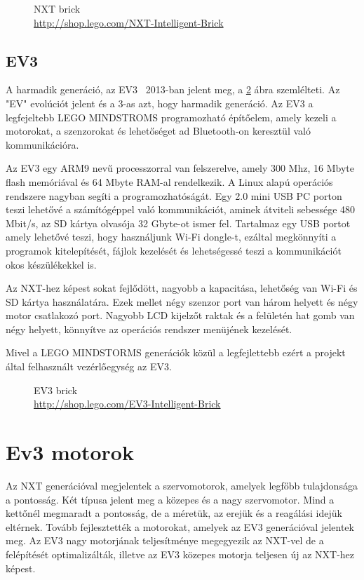 \begin{figure}[!htb]
	\centering
	\caption[NXT brick]
	{NXT brick\\
	\href{http://shop.lego.com/en-CA/NXT-Intelligent-Brick-9841}{http://shop.lego.com/NXT-Intelligent-Brick}}
	\label{fig:NXT}
\end{figure}

\subsection{EV3}

A harmadik generáció, az EV3~\cite{ev3Attribution}\cite{nxtVsEv3} 2013-ban jelent meg, a \ref{fig:EV3} ábra szemlélteti. Az "EV" evolúciót jelent és a 3-as azt, hogy harmadik generáció. Az EV3 a legfejeltebb LEGO MINDSTROMS programozható építőelem, amely kezeli a motorokat, a szenzorokat és lehetőséget ad Bluetooth-on keresztül való kommunikációra.

Az EV3 egy ARM9 nevű processzorral van felszerelve, amely 300 Mhz, 16 Mbyte flash memóriával és 64 Mbyte RAM-al rendelkezik. A Linux alapú operációs rendszere nagyban segíti a programozhatóságát. Egy 2.0 mini USB PC porton teszi lehetővé a számítógéppel való kommunikációt, aminek átviteli sebessége 480 Mbit/s, az SD kártya olvasója 32 Gbyte-ot ismer fel. Tartalmaz egy USB portot amely lehetővé teszi, hogy használjunk Wi-Fi dongle-t, ezáltal megkönnyíti a programok kitelepítését, fájlok kezelését és lehetségessé teszi a kommunikációt okos készülékekkel is.

Az NXT-hez képest sokat fejlődött, nagyobb a kapacitása, lehetőség van Wi-Fi és SD kártya használatára. Ezek mellet négy szenzor port van három helyett és négy motor csatlakozó port. Nagyobb LCD kijelzőt raktak és a felületén hat gomb van négy helyett, könnyítve az operációs rendszer menüjének kezelését.\cite{nxtVsEv3}

Mivel a LEGO MINDSTORMS generációk közül a legfejlettebb ezért a projekt által felhasznált vezérlőegység az EV3.

\begin{figure}[!htb]
	\centering
	\caption[EV3 brick]
	{EV3 brick\\
	\href{http://shop.lego.com/en-CA/EV3-Intelligent-Brick-45500}{http://shop.lego.com/EV3-Intelligent-Brick}}
	\label{fig:EV3}
\end{figure}


\section{Ev3 motorok}\label{sec:ROBOT:motorok}
Az NXT generációval megjelentek a szervomotorok, amelyek legfőbb tulajdonsága a pontosság. Két típusa jelent meg a közepes és a nagy szervomotor. Mind a kettőnél megmaradt a pontosság, de a méretük, az erejük és a reagálási idejük eltérnek. Tovább fejlesztették a motorokat, amelyek az EV3 generációval jelentek meg. Az EV3 nagy motorjának teljesítménye megegyezik az NXT-vel de a felépítését optimalizálták, illetve az EV3 közepes motorja teljesen új az NXT-hez képest.

